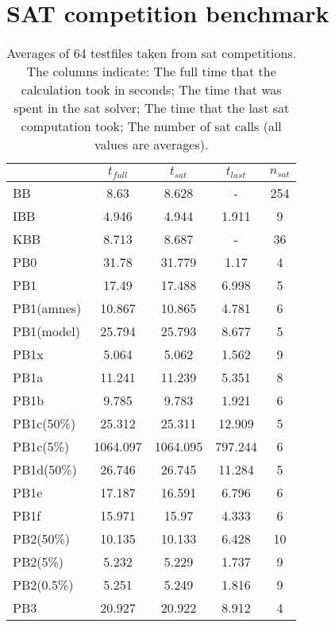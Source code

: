 \section{SAT competition benchmark}
\begin{wraptable}{r}{8.5cm} %
\begin{tabular}{l| c c c c}
 & $t_{full}$ & $t_{sat}$ & $t_{last}$& $n_{sat}$ \\
 \hline
BB & 8.63 & 8.628 & - & 254\\
IBB & 4.946 & 4.944 & 1.911 & 9\\
KBB & 8.713 & 8.687 & - & 36\\
PB0 & 31.78 & 31.779 & 1.17 & 4\\
PB1 & 17.49 & 17.488 & 6.998 & 5\\
PB1(amnes) & 10.867 & 10.865 & 4.781 & 6\\
PB1(model) & 25.794 & 25.793 & 8.677 & 5\\
PB1x & 5.064 & 5.062 & 1.562 & 9\\
PB1a & 11.241 & 11.239 & 5.351 & 8\\
PB1b & 9.785 & 9.783 & 1.921 & 6\\
PB1c(50\%) & 25.312 & 25.311 & 12.909 & 5\\
PB1c(5\%) & 1064.097 & 1064.095 & 797.244 & 6\\
PB1d(50\%) & 26.746 & 26.745 & 11.284 & 5\\
PB1e & 17.187 & 16.591 & 6.796 & 6\\
PB1f & 15.971 & 15.97 & 4.333 & 6\\
PB2(50\%) & 10.135 & 10.133 & 6.428 & 10\\
PB2(5\%) & 5.232 & 5.229 & 1.737 & 9\\
PB2(0.5\%) & 5.251 & 5.249 & 1.816 & 9\\
PB3 & 20.927 & 20.922 & 8.912 & 4\\
\end{tabular}
\caption{Averages of 64 testfiles taken from sat competitions. The columns indicate: The full time that the calculation took in seconds; The time that was spent in the sat solver; The time that the last sat computation took; The number of sat calls (all values are averages).}
\label{tab:satCompAvg} %
\end{wraptable}

